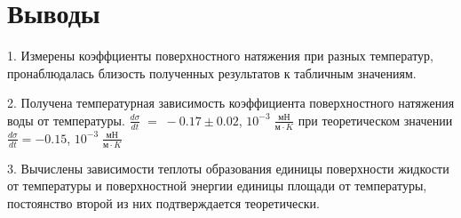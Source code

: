 \documentclass[a4paper,12pt]{article} %
\begin{document}
\section{Выводы}
\hspace{5mm}
1. Измерены коэффциенты поверхностного натяжения при разных температур, пронаблюдалась близость полученных результатов к табличным значениям.
 
2. Получена температурная зависимость коэффициента поверхностного натяжения воды от температуры. $\frac{d\sigma}{dt} \;=\; -0.17 \pm 0.02$, $10^{-3}\; \frac{мН}{м\cdot K}$ при теоретическом значении $\frac{d\sigma}{dt} = -0.15$, $10^{-3}\; \frac{мН}{м\cdot K}$

3. Вычислены зависимости теплоты образования единицы поверхности жидкости от температуры и поверхностной энергии единицы площади от температуры, постоянство второй из них подтверждается теоретически.
\end{document}
